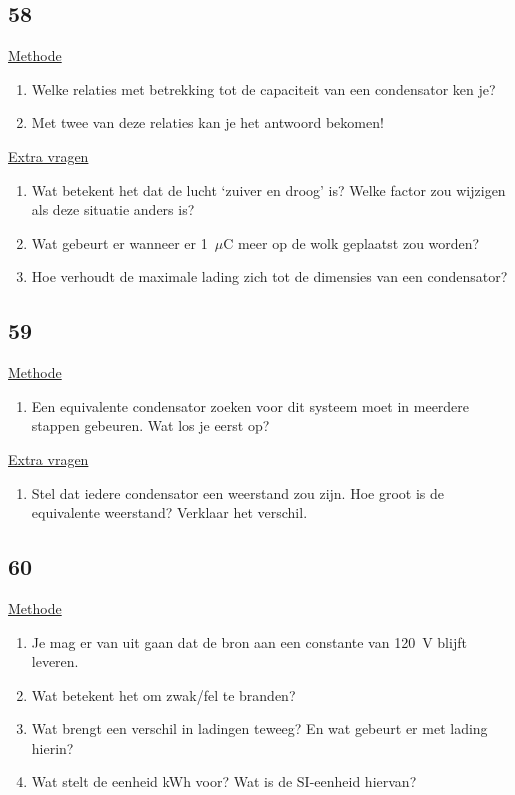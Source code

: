 \subsection*{58}
\underline{Methode}
\begin{enumerate}
	\item Welke relaties met betrekking tot de capaciteit van een condensator ken je? 
	\item Met twee van deze relaties kan je het antwoord bekomen!
\end{enumerate}

\underline{Extra vragen}
\begin{enumerate}
	\item Wat betekent het dat de lucht `zuiver en droog' is? Welke factor zou wijzigen als deze situatie anders is?
	\item Wat gebeurt er wanneer er 1~$\mu$C meer op de wolk geplaatst zou worden?
	\item Hoe verhoudt de maximale lading zich tot de dimensies van een condensator?
\end{enumerate}





\subsection*{59}
\underline{Methode}
\begin{enumerate}
	\item Een equivalente condensator zoeken voor dit systeem moet in meerdere stappen gebeuren. Wat los je eerst op?
\end{enumerate}

\underline{Extra vragen}
\begin{enumerate}
	\item Stel dat iedere condensator een weerstand zou zijn. Hoe groot is de equivalente weerstand? Verklaar het verschil.
\end{enumerate}




\subsection*{60}
\underline{Methode}
\begin{enumerate}
	\item Je mag er van uit gaan dat de bron aan een constante van 120~V blijft leveren. 
	\item Wat betekent het om zwak/fel te branden?
	\item Wat brengt een verschil in ladingen teweeg? En wat gebeurt er met lading hierin?
	\item Wat stelt de eenheid kWh voor? Wat is de SI-eenheid hiervan?
\end{enumerate}



